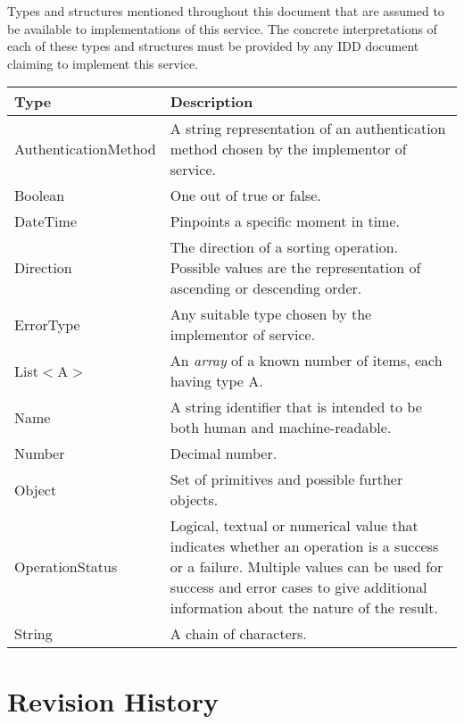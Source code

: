 \documentclass[a4paper]{arrowhead}
\newcommand{\pdef}[1]{{\textcolor{ArrowheadGrey}{#1\label{sec:model:primitives:#1}\label{sec:model:primitives:#1s}\label{sec:model:primitives:#1es}}}}
\begin{document}
Types and structures mentioned throughout this document that are assumed to be available to implementations of this service.
The concrete interpretations of each of these types and structures must be provided by any IDD document claiming to implement this service.

\begin{table}[ht!]
\begin{tabularx}{\textwidth}{| p{3.5cm} | X |} \hline
\rowcolor{gray!33} Type & Description \\ \hline
\pdef{AuthenticationMethod} & A string representation of an authentication method chosen by the implementor of service. \\ \hline
\pdef{Boolean}          & One out of true or false. \\ \hline
\pdef{DateTime}         & Pinpoints a specific moment in time. \\ \hline
\pdef{Direction}        & The direction of a sorting operation. Possible values are the representation of ascending or descending order. \\ \hline
\pdef{ErrorType}        & Any suitable type chosen by the implementor of service. \\ \hline
\pdef{List}$<$A$>$      & An \textit{array} of a known number of items, each having type A. \\ \hline
\pdef{Name}             & A string identifier that is intended to be both human and machine-readable. \\ \hline
\pdef{Number}           & Decimal number. \\ \hline
\pdef{Object}           & Set of primitives and possible further objects. \\ \hline
\pdef{OperationStatus}  & Logical, textual or numerical value that indicates whether an operation is a success or a failure. Multiple values can be used for success and error cases to give additional information about the nature of the result. \\ \hline
\pdef{String}           & A chain of characters. \\ \hline
\end{tabularx}
\end{table}

\newpage




\newpage

\section{Revision History}
\end{document}
